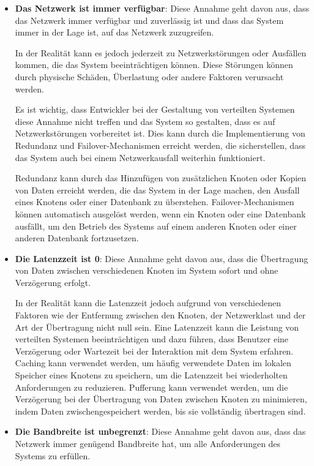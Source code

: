 \documentclass[../vs-script-first-v01.tex]{subfiles}
\begin{document}
\begin{itemize}
  \item \textbf{Das Netzwerk ist immer verfügbar}: Diese Annahme geht davon aus, dass das Netzwerk immer verfügbar und zuverlässig ist und dass das System immer in der Lage ist, auf das Netzwerk zuzugreifen.

        In der Realität kann es jedoch jederzeit zu Netzwerkstörungen oder Ausfällen kommen, die das System beeinträchtigen können. Diese Störungen können durch physische Schäden, Überlastung oder andere Faktoren verursacht werden.

        Es ist wichtig, dass Entwickler bei der Gestaltung von verteilten Systemen diese Annahme nicht treffen und das System so gestalten, dass es auf Netzwerkstörungen vorbereitet ist. Dies kann durch die Implementierung von Redundanz und Failover-Mechanismen erreicht werden, die sicherstellen, dass das System auch bei einem Netzwerkausfall weiterhin funktioniert.

        Redundanz kann durch das Hinzufügen von zusätzlichen Knoten oder Kopien von Daten erreicht werden, die das System in der Lage machen, den Ausfall eines Knotens oder einer Datenbank zu überstehen. Failover-Mechanismen können automatisch ausgelöst werden, wenn ein Knoten oder eine Datenbank ausfällt, um den Betrieb des Systems auf einem anderen Knoten oder einer anderen Datenbank fortzusetzen.

  \item \textbf{Die Latenzzeit ist 0}: Diese Annahme geht davon aus, dass die Übertragung von Daten zwischen verschiedenen Knoten im System sofort und ohne Verzögerung erfolgt.

        In der Realität kann die Latenzzeit jedoch aufgrund von verschiedenen Faktoren wie der Entfernung zwischen den Knoten, der Netzwerklast und der Art der Übertragung nicht null sein. Eine Latenzzeit kann die Leistung von verteilten Systemen beeinträchtigen und dazu führen, dass Benutzer eine Verzögerung oder Wartezeit bei der Interaktion mit dem System erfahren.
        Caching kann verwendet werden, um häufig verwendete Daten im lokalen Speicher eines Knotens zu speichern, um die Latenzzeit bei wiederholten Anforderungen zu reduzieren. Pufferung kann verwendet werden, um die Verzögerung bei der Übertragung von Daten zwischen Knoten zu minimieren, indem Daten zwischengespeichert werden, bis sie vollständig übertragen sind.
  \item \textbf{Die Bandbreite ist unbegrenzt}: Diese Annahme geht davon aus, dass das Netzwerk immer genügend Bandbreite hat, um alle Anforderungen des Systems zu erfüllen.


\end{itemize}
\end{document}
